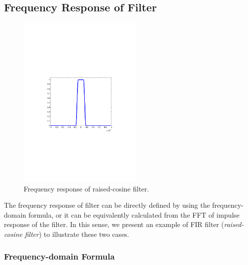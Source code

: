 \documentclass[a4paper]{article}
\begin{document}
\subsection{Frequency Response of Filter}
\begin{figure}[t!]
    \centering
    \includegraphics[width=6cm]{rc-fd-filter-SpS8}
    \caption{Frequency response of raised-cosine filter.}
    \label{freq_rc}
\end{figure}

The frequency response of filter can be directly defined by using the frequency-domain formula, or it can be equivalently calculated from the FFT of impulse response of the filter. In this sense, we present an example of FIR filter (\textit{raised-cosine filter}) to illustrate these two cases.

\subsubsection{Frequency-domain Formula}
\end{document}
